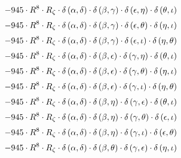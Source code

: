 \begin{subequations}
\begin{gather}
 \\[0.2em] \notag 		 - 945 \cdot R^{8} \cdot R_{\zeta{}} \cdot \delta{}\left(\alpha{}, \delta{}\right) \cdot \delta{}\left(\beta{}, \gamma{}\right) \cdot \delta{}\left(\epsilon{}, \eta{}\right) \cdot \delta{}\left(\theta{}, \iota{}\right) 
 \\[0.2em] \notag 		 - 945 \cdot R^{8} \cdot R_{\zeta{}} \cdot \delta{}\left(\alpha{}, \delta{}\right) \cdot \delta{}\left(\beta{}, \gamma{}\right) \cdot \delta{}\left(\epsilon{}, \theta{}\right) \cdot \delta{}\left(\eta{}, \iota{}\right) 
 \\[0.2em] \notag 		 - 945 \cdot R^{8} \cdot R_{\zeta{}} \cdot \delta{}\left(\alpha{}, \delta{}\right) \cdot \delta{}\left(\beta{}, \gamma{}\right) \cdot \delta{}\left(\epsilon{}, \iota{}\right) \cdot \delta{}\left(\eta{}, \theta{}\right) 
 \\[0.2em] \notag 		 - 945 \cdot R^{8} \cdot R_{\zeta{}} \cdot \delta{}\left(\alpha{}, \delta{}\right) \cdot \delta{}\left(\beta{}, \epsilon{}\right) \cdot \delta{}\left(\gamma{}, \eta{}\right) \cdot \delta{}\left(\theta{}, \iota{}\right) 
 \\[0.2em] \notag 		 - 945 \cdot R^{8} \cdot R_{\zeta{}} \cdot \delta{}\left(\alpha{}, \delta{}\right) \cdot \delta{}\left(\beta{}, \epsilon{}\right) \cdot \delta{}\left(\gamma{}, \theta{}\right) \cdot \delta{}\left(\eta{}, \iota{}\right) 
 \\[0.2em] \notag 		 - 945 \cdot R^{8} \cdot R_{\zeta{}} \cdot \delta{}\left(\alpha{}, \delta{}\right) \cdot \delta{}\left(\beta{}, \epsilon{}\right) \cdot \delta{}\left(\gamma{}, \iota{}\right) \cdot \delta{}\left(\eta{}, \theta{}\right) 
 \\[0.2em] \notag 		 - 945 \cdot R^{8} \cdot R_{\zeta{}} \cdot \delta{}\left(\alpha{}, \delta{}\right) \cdot \delta{}\left(\beta{}, \eta{}\right) \cdot \delta{}\left(\gamma{}, \epsilon{}\right) \cdot \delta{}\left(\theta{}, \iota{}\right) 
 \\[0.2em] \notag 		 - 945 \cdot R^{8} \cdot R_{\zeta{}} \cdot \delta{}\left(\alpha{}, \delta{}\right) \cdot \delta{}\left(\beta{}, \eta{}\right) \cdot \delta{}\left(\gamma{}, \theta{}\right) \cdot \delta{}\left(\epsilon{}, \iota{}\right) 
 \\[0.2em] \notag 		 - 945 \cdot R^{8} \cdot R_{\zeta{}} \cdot \delta{}\left(\alpha{}, \delta{}\right) \cdot \delta{}\left(\beta{}, \eta{}\right) \cdot \delta{}\left(\gamma{}, \iota{}\right) \cdot \delta{}\left(\epsilon{}, \theta{}\right) 
 \\[0.2em] \notag 		 - 945 \cdot R^{8} \cdot R_{\zeta{}} \cdot \delta{}\left(\alpha{}, \delta{}\right) \cdot \delta{}\left(\beta{}, \theta{}\right) \cdot \delta{}\left(\gamma{}, \epsilon{}\right) \cdot \delta{}\left(\eta{}, \iota{}\right) 

\end{gather}
\end{subequations}
